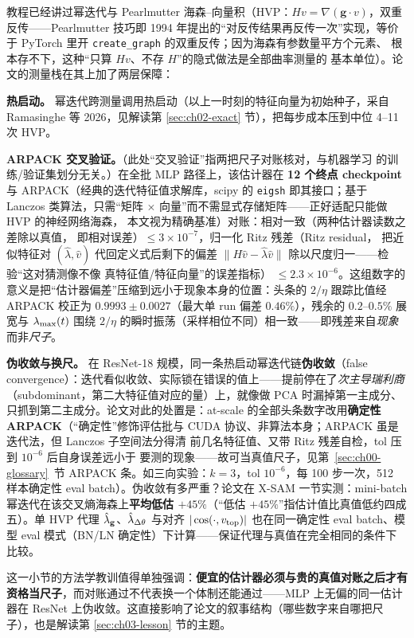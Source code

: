 教程已经讲过幂迭代与 Pearlmutter
海森--向量积（HVP：$Hv=\nabla(\mathbf{g}\!\cdot\!v)$，双重反传——Pearlmutter
技巧即 1994 年提出的“对反传结果再反传一次”实现，等价于 PyTorch
里开 \texttt{create\_graph} 的双重反传；因为海森有参数量平方个元素、
根本存不下，这种“只算 $Hv$、不存 $H$”的隐式做法是全部曲率测量的
基本单位）。论文的测量栈在其上加了两层保障：

\textbf{热启动。} 幂迭代跨测量调用热启动（以上一时刻的特征向量为初始种子，采自
Ramasinghe 等 2026，见解读第 \ref{sec:ch02-exact} 节），把每步成本压到中位 4--11 次
HVP。

\textbf{ARPACK 交叉验证。}（此处“交叉验证”指两把尺子对账核对，与机器学习
的训练/验证集划分无关。）在全批 MLP 路径上，该估计器在 \textbf{12 个终点
checkpoint} 与 ARPACK（经典的迭代特征值求解库，scipy 的
\texttt{eigsh} 即其接口；基于 Lanczos 类算法，只需“矩阵 $\times$
向量”而不需显式存储矩阵——正好适配只能做 HVP 的神经网络海森，
本文视为精确基准）对账：相对一致（两种估计器读数之差除以真值，
即相对误差）$\le3\times10^{-7}$，归一化 Ritz 残差（Ritz residual，
把近似特征对 $(\hat\lambda,\hat v)$ 代回定义式后剩下的偏差
$\|H\hat v-\hat\lambda\hat v\|$ 除以尺度归一——检验“这对猜测像不像
真特征值/特征向量”的误差指标）
$\le2.3\times10^{-6}$。这组数字的意义是把“估计器偏差”压缩到远小于现象本身的位置：头条的
$2/\eta$ 跟踪比值经 ARPACK 校正为 $0.9993\pm0.0027$（最大单 run 偏差
$0.46\%$），残余的 $0.2$--$0.5\%$ 展宽与 $\lambda_{\max}(t)$ 围绕 $2/\eta$
的瞬时振荡（采样相位不同）相一致——即残差来自\emph{现象}而非\emph{尺子}。

\textbf{伪收敛与换尺。} 在 ResNet-18
规模，同一条热启动幂迭代链\textbf{伪收敛}（false
convergence）：迭代看似收敛、实际锁在错误的值上——提前停在了\emph{次主导瑞利商}（subdominant，第二大特征值对应的量）上，就像做
PCA 时漏掉第一主成分、只抓到第二主成分。论文对此的处置是：at-scale
的全部头条数字改用\textbf{确定性 ARPACK}（``确定性''修饰评估批与
CUDA 协议、非算法本身；ARPACK 虽是迭代法，但 Lanczos 子空间法分得清
前几名特征值、又带 Ritz 残差自检，tol 压到 $10^{-6}$ 后自身误差远小于
要测的现象——故可当真值尺子，见第~\ref{sec:ch00-glossary}~节
ARPACK 条。如三向实验：$k{=}3$，tol $10^{-6}$，每 100
步一次，512 样本确定性 eval batch）。伪收敛有多严重？论文在 X-SAM
一节实测：mini-batch 幂迭代在该交叉熵海森上\textbf{平均低估 $+45\%$}（“低估
$+45\%$”指估计值比真值低约四成五）。单 HVP 代理 $\hat{\lambda}_{\mathbf{g}}$、$\hat{\lambda}_{\Delta\theta}$ 与对齐
$|\cos(\cdot,v_{\mathrm{top}})|$ 也在同一确定性 eval batch、模型 eval 模式（BN/LN
确定性）下计算——保证代理与真值在完全相同的条件下比较。

这一小节的方法学教训值得单独强调：\textbf{便宜的估计器必须与贵的真值对账之后才有资格当尺子}，而对账通过不代表换一个体制还能通过——MLP
上无偏的同一估计器在 ResNet
上伪收敛。这直接影响了论文的叙事结构（哪些数字来自哪把尺子），也是解读第
\ref{sec:ch03-lesson} 节的主题。

